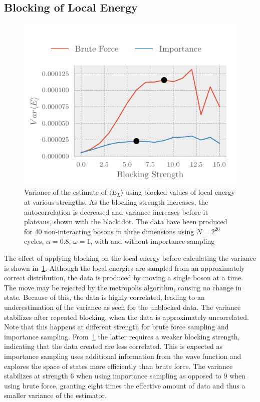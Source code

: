 \subsection{Blocking of Local Energy}
\begin{figure}
  \includegraphics{figures/blocking1.pdf}
	\centering
	\caption{Variance of the estimate of $\langle E_{L} \rangle$ using blocked values of local
      energy at various strengths. As the blocking strength increases, the
      autocorrelation is decreased and variance increases before it plateaus,
      shown with the black dot. The data have been produced for 40
      non-interacting bosons in three dimensions using $N = 2^{20}$ cycles, $\alpha =
      0.8$, $\omega = 1$, with and without importance sampling}
	\label{fig:blocking1}
\end{figure}

The effect of applying blocking on the local energy before calculating the
variance is shown in~\cref{fig:blocking1}. Although the local energies are
sampled from an approximately correct distribution, the data is produced by moving a single
boson at a time. The move may be rejected by the metropolis
algorithm, causing no change in state. Because of this, the data is highly correlated,
leading to an underestimation of the variance as seen for the unblocked data.
The variance stabilizes after repeated blocking, when the data is
approximately uncorrelated. Note that this happens at different strength
for brute force sampling and importance sampling. From~\cref{fig:blocking1}
the latter requires a weaker blocking strength, indicating that
the data created are less correlated. This is expected as
importance sampling uses additional information from the wave function and
explores the space of states more efficiently than brute force.
The variance stabilizes at strength $6$ when
using importance sampling as opposed to $9$ when using brute force, granting
eight times the effective amount of data and thus a smaller variance of the
estimator.


